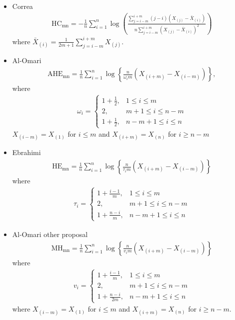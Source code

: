 \documentclass[journal]{IEEEtran}
\begin{document}
\begin{itemize}
\vspace{3mm}
	\item Correa
	\begin{align}
		\label{HC}
		\text{HC}_\text{{mn}}=-\frac{1}{n} \sum_{i=1}^{n} \log \left(\frac{\sum_{j=i-m}^{i+m}(j-i)\left(X_{(j)}-\bar{X}_{(i)}\right)}{n \sum_{j=i-m}^{i+m}\left(X_{(j)}-\bar{X}_{(i)}\right)^{2}}\right)
	\end{align}
where $\bar{X}_{(i)}=\frac{1}{2 m+1} \sum_{j=i-m}^{i+m} X_{(j)}$.

\vspace{3mm}
	\item Al-Omari
	\label{AHE}
	\begin{align}
	\text{AHE}_\text{{mn}}=\frac{1}{n} \sum_{i=1}^{n} \log \left\{\frac{n}{\omega_{i} m}\left(X_{(i+m)}-X_{(i-m)}\right)\right\}, 
	\end{align}
	where
	\begin{align}
	\omega_{i}=\left\{\begin{array}{lc}
		1+\frac{1}{2}, & 1 \leq i \leq m \\
		2, & m+1 \leq i \leq n-m \\
		1+\frac{1}{2}, & n-m+1 \leq i \leq n
	\end{array}\right.
	\end{align}
	$X_{(i-m)}=X_{(1)}$ for $i \leq m$ and $X_{(i+m)}=X_{(n)}$ for $i \geq n-m$

\vspace{3mm}	
	\item Ebrahimi
	\label{HE}
	\begin{align}
	\text{HE}_\text{{mn}}=\frac{1}{n} \sum_{i=1}^{n} \log \left\{\frac{n}{\tau_{i} m}\left(X_{(i+m)}-X_{(i-m)}\right)\right\}
	\end{align}
	where
	\begin{align}
	\tau_{i}=\left\{\begin{array}{ll}
		1+\frac{i-1}{m}, & 1 \leq i \leq m \\
		2, & m+1 \leq i \leq n-m \\
		1+\frac{n-i}{m}, & n-m+1 \leq i \leq n
	\end{array}\right.
	\end{align}

\vspace{3mm}
	\item Al-Omari other proposal 
	\label{MH}
	\begin{align}
	\text{MH}_\text{{mn}}=\frac{1}{n} \sum_{i=1}^{n} \log \left\{\frac{n}{v_{i} m}\left(X_{(i+m)}-X_{(i-m)}\right)\right\}
	\end{align}
where
	\begin{align}
	v_{i}=\left\{\begin{array}{ll}
	1+\frac{i-1}{m}, & 1 \leq i \leq m \\
	2, & m+1 \leq i \leq n-m \\
	1+\frac{n-i}{2 m}, & n-m+1 \leq i \leq n
	\end{array}\right.
	\end{align}
where $X_{(i-m)}=X_{(1)}$ for $i \leq m$ and $X_{(i+m)}=X_{(n)}$ for $i \geq n-m$.

\end{itemize}
\end{document}
